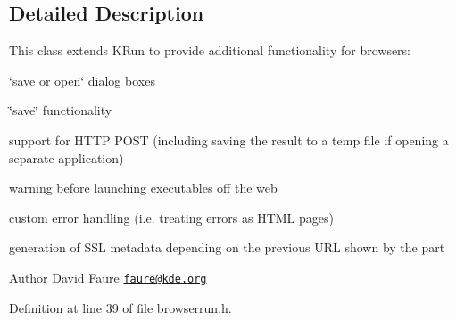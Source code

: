 \subsection{Detailed Description}
This class extends K\+Run to provide additional functionality for browsers\+:
\begin{DoxyItemize}
\item \char`\"{}save or open\char`\"{} dialog boxes
\item \char`\"{}save\char`\"{} functionality
\item support for H\+T\+T\+P P\+O\+S\+T (including saving the result to a temp file if opening a separate application)
\item warning before launching executables off the web
\item custom error handling (i.\+e. treating errors as H\+T\+M\+L pages)
\item generation of S\+S\+L metadata depending on the previous U\+R\+L shown by the part \begin{DoxyAuthor}{Author}
David Faure \href{mailto:faure@kde.org}{\tt faure@kde.\+org} 
\end{DoxyAuthor}

\end{DoxyItemize}

Definition at line 39 of file browserrun.\+h.



